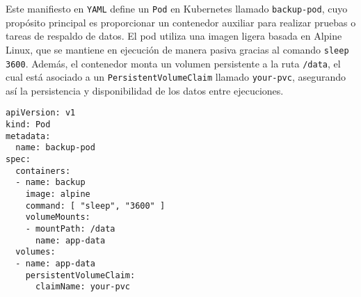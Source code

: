 Este manifiesto en \texttt{YAML} define un \texttt{Pod} en Kubernetes llamado \texttt{backup-pod}, cuyo propósito principal es proporcionar un contenedor auxiliar para realizar pruebas o tareas de respaldo de datos. El pod utiliza una imagen ligera basada en Alpine Linux, que se mantiene en ejecución de manera pasiva gracias al comando \texttt{sleep 3600}. Además, el contenedor monta un volumen persistente a la ruta \texttt{/data}, el cual está asociado a un \texttt{PersistentVolumeClaim} llamado \texttt{your-pvc}, asegurando así la persistencia y disponibilidad de los datos entre ejecuciones.

\begin{verbatim}
apiVersion: v1
kind: Pod
metadata:
  name: backup-pod
spec:
  containers:
  - name: backup
    image: alpine
    command: [ "sleep", "3600" ]
    volumeMounts:
    - mountPath: /data
      name: app-data
  volumes:
  - name: app-data
    persistentVolumeClaim:
      claimName: your-pvc
\end{verbatim}
